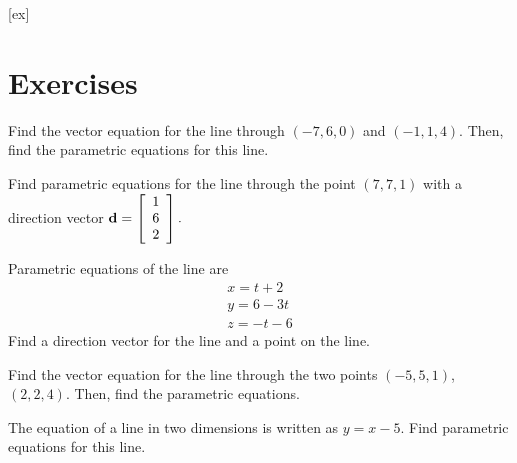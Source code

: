 [ex]
\section*{Exercises}

\begin{enumialphparenastyle}

\begin{ex} 
Find the vector equation for the line through $\left(
-7,6,0\right)$ and $\left(-1, 1 ,4 \right) .$  Then, find the parametric equations for this line. 
\end{ex}

\begin{ex} Find parametric equations for the line through the point $\left( 7, 7, 1 \right) $ with a direction vector ${\bf d} = \left[
\begin{array}{r}
1 \\
6 \\
2
\end{array}
\right] .$ 
\end{ex} 

\begin{ex} Parametric equations of the line are 
\begin{equation*}
\begin{array}{c}
x = t+2 \\
y = 6-3t \\
z = -t-6
\end{array}
\end{equation*}
Find a direction vector for the line and a point on the line.
\end{ex} 


\begin{ex} Find the vector equation for the line through the two points $\left(
-5, 5, 1 \right) $, $\left(2, 2 , 4 \right) .$  Then, find the parametric equations. 
\end{ex} 

\begin{ex} The equation of a line in two dimensions is written as $y=x-5.$ Find
parametric equations for this line. 
\end{ex} 


\end{enumialphparenastyle}
